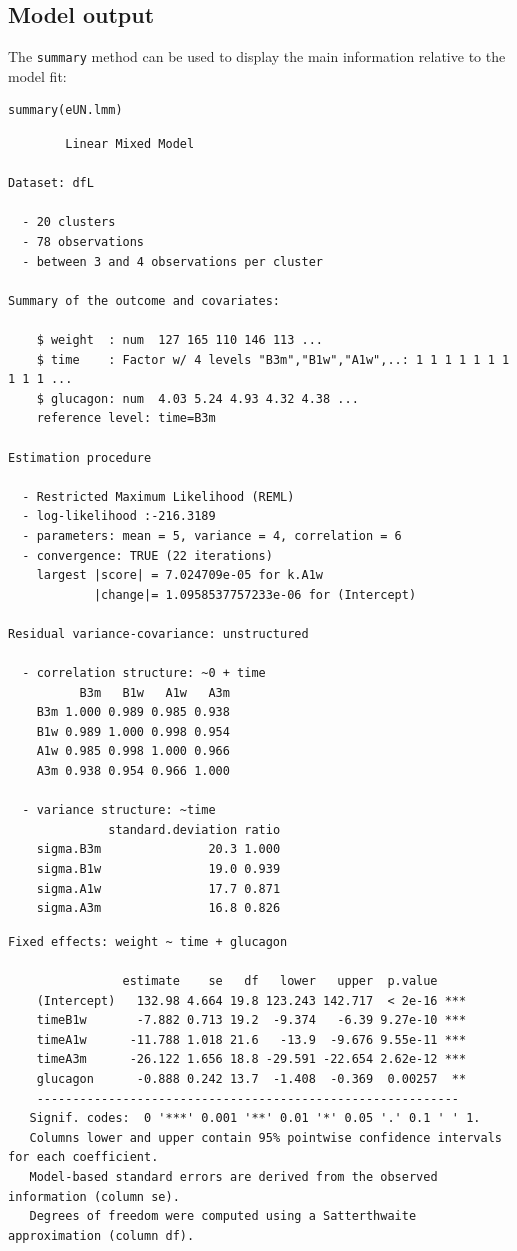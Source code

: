 \documentclass[12pt]{article}
\begin{document}
\subsection{Model output}
\label{sec:orgaac6a79}

The \texttt{summary} method can be used to display the main information
relative to the model fit:
\lstset{language=r,label= ,caption= ,captionpos=b,numbers=none}
\begin{lstlisting}
summary(eUN.lmm)
\end{lstlisting}

\begin{verbatim}
		Linear Mixed Model 
 
Dataset: dfL 

  - 20 clusters 
  - 78 observations 
  - between 3 and 4 observations per cluster 

Summary of the outcome and covariates: 

    $ weight  : num  127 165 110 146 113 ...
    $ time    : Factor w/ 4 levels "B3m","B1w","A1w",..: 1 1 1 1 1 1 1 1 1 1 ...
    $ glucagon: num  4.03 5.24 4.93 4.32 4.38 ...
    reference level: time=B3m 

Estimation procedure 

  - Restricted Maximum Likelihood (REML) 
  - log-likelihood :-216.3189
  - parameters: mean = 5, variance = 4, correlation = 6
  - convergence: TRUE (22 iterations) 
    largest |score| = 7.024709e-05 for k.A1w
            |change|= 1.0958537757233e-06 for (Intercept)
 
Residual variance-covariance: unstructured 

  - correlation structure: ~0 + time 
          B3m   B1w   A1w   A3m
    B3m 1.000 0.989 0.985 0.938
    B1w 0.989 1.000 0.998 0.954
    A1w 0.985 0.998 1.000 0.966
    A3m 0.938 0.954 0.966 1.000

  - variance structure: ~time 
              standard.deviation ratio
    sigma.B3m               20.3 1.000
    sigma.B1w               19.0 0.939
    sigma.A1w               17.7 0.871
    sigma.A3m               16.8 0.826
\end{verbatim}

\clearpage

\begin{verbatim}
Fixed effects: weight ~ time + glucagon 
 
                estimate    se   df   lower   upper  p.value    
    (Intercept)   132.98 4.664 19.8 123.243 142.717  < 2e-16 ***
    timeB1w       -7.882 0.713 19.2  -9.374   -6.39 9.27e-10 ***
    timeA1w      -11.788 1.018 21.6   -13.9  -9.676 9.55e-11 ***
    timeA3m      -26.122 1.656 18.8 -29.591 -22.654 2.62e-12 ***
    glucagon      -0.888 0.242 13.7  -1.408  -0.369  0.00257  **
    ----------------------------------------------------------- 
   Signif. codes:  0 '***' 0.001 '**' 0.01 '*' 0.05 '.' 0.1 ' ' 1.
   Columns lower and upper contain 95% pointwise confidence intervals for each coefficient.
   Model-based standard errors are derived from the observed information (column se). 
   Degrees of freedom were computed using a Satterthwaite approximation (column df).
\end{verbatim}
\end{document}
